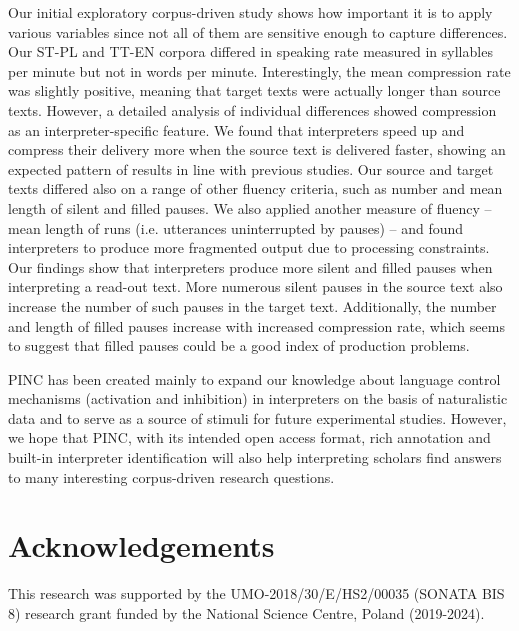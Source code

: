 \documentclass[output=paper]{langscibook}
\begin{document}
Our initial exploratory corpus-driven study shows how important it is to apply various variables since not all of them are sensitive enough to capture differences. Our ST-PL and TT-EN corpora differed in speaking rate measured in syllables per minute but not in words per minute. Interestingly, the mean compression rate was slightly positive, meaning that target texts were actually longer than source texts. However, a detailed analysis of individual differences showed compression as an interpreter-specific feature. We found that interpreters speed up and compress their delivery more when the source text is delivered faster, showing an expected pattern of results in line with previous studies. Our source and target texts differed also on a range of other fluency criteria, such as number and mean length of silent and filled pauses. We also applied another measure of fluency – mean length of runs (i.e. utterances uninterrupted by pauses) – and found interpreters to produce more fragmented output due to processing constraints. Our findings show that interpreters produce more silent and filled pauses when interpreting a read-out text. More numerous silent pauses in the source text also increase the number of such pauses in the target text. Additionally, the number and length of filled pauses increase with increased compression rate, which seems to suggest that filled pauses could be a good index of production problems.

PINC has been created mainly to expand our knowledge about language control mechanisms (activation and inhibition) in interpreters on the basis of naturalistic data and to serve as a source of stimuli for future experimental studies. However, we hope that PINC, with its intended open access format, rich annotation and built-in interpreter identification will also help interpreting scholars find answers to many interesting corpus-driven research questions. 

\section*{Acknowledgements}
This research was supported by the UMO-2018/30/E/HS2/00035 (SONATA BIS 8) research grant funded by the National Science Centre, Poland (2019-2024). 

\sloppy\printbibliography[heading=subbibliography,notkeyword=this]
\end{document}
